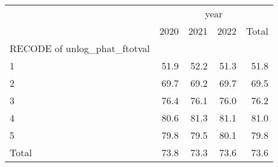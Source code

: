 \begin{tabular}{lllll}
\cline{1-5}
\multicolumn{1}{c}{} &
  \multicolumn{4}{|c}{year} \\
\multicolumn{1}{c}{} &
  \multicolumn{1}{|r}{2020} &
  \multicolumn{1}{r}{2021} &
  \multicolumn{1}{r}{2022} &
  \multicolumn{1}{r}{Total} \\
\cline{1-5}
\multicolumn{1}{l}{RECODE of unlog\_phat\_ftotval} &
  \multicolumn{1}{|r}{} &
  \multicolumn{1}{r}{} &
  \multicolumn{1}{r}{} &
  \multicolumn{1}{r}{} \\
\multicolumn{1}{l}{\hspace{1em}1} &
  \multicolumn{1}{|r}{51.9} &
  \multicolumn{1}{r}{52.2} &
  \multicolumn{1}{r}{51.3} &
  \multicolumn{1}{r}{51.8} \\
\multicolumn{1}{l}{\hspace{1em}2} &
  \multicolumn{1}{|r}{69.7} &
  \multicolumn{1}{r}{69.2} &
  \multicolumn{1}{r}{69.7} &
  \multicolumn{1}{r}{69.5} \\
\multicolumn{1}{l}{\hspace{1em}3} &
  \multicolumn{1}{|r}{76.4} &
  \multicolumn{1}{r}{76.1} &
  \multicolumn{1}{r}{76.0} &
  \multicolumn{1}{r}{76.2} \\
\multicolumn{1}{l}{\hspace{1em}4} &
  \multicolumn{1}{|r}{80.6} &
  \multicolumn{1}{r}{81.3} &
  \multicolumn{1}{r}{81.1} &
  \multicolumn{1}{r}{81.0} \\
\multicolumn{1}{l}{\hspace{1em}5} &
  \multicolumn{1}{|r}{79.8} &
  \multicolumn{1}{r}{79.5} &
  \multicolumn{1}{r}{80.1} &
  \multicolumn{1}{r}{79.8} \\
\multicolumn{1}{l}{\hspace{1em}Total} &
  \multicolumn{1}{|r}{73.8} &
  \multicolumn{1}{r}{73.3} &
  \multicolumn{1}{r}{73.6} &
  \multicolumn{1}{r}{73.6} \\
\cline{1-5}
\end{tabular}
